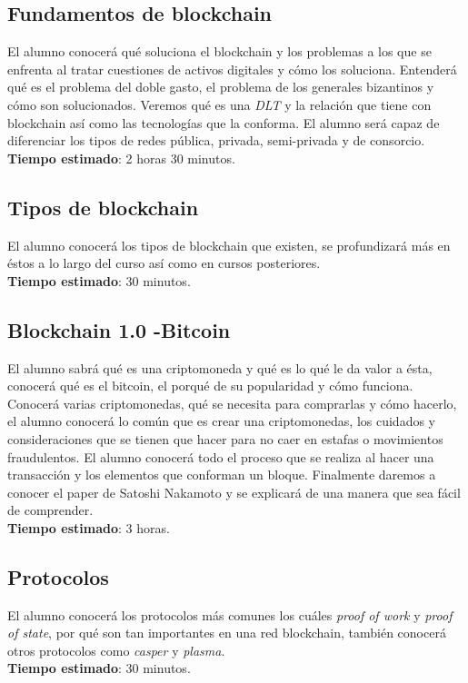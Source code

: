\documentclass[a4paper,12pt]{/home/armando/Documentos/Cursos/LaTeX/Plantillas/lib/pub}
\begin{document}
\subsection{Fundamentos de blockchain}
El alumno conocerá qué soluciona el blockchain y los problemas a los que se enfrenta al tratar cuestiones de activos digitales y cómo los soluciona. Entenderá qué es el problema del doble gasto, el problema de los generales bizantinos y cómo son solucionados. Veremos qué es una \textit{DLT} y la relación que tiene con blockchain así como las tecnologías que la conforma. El alumno será capaz de diferenciar los tipos de redes pública, privada, semi-privada y de consorcio.\\
\textbf{Tiempo estimado}: 2 horas 30 minutos.

\subsection{Tipos de blockchain}
El alumno conocerá los tipos de blockchain que existen, se profundizará más en éstos a lo largo del curso así como en cursos posteriores.\\
\textbf{Tiempo estimado}: 30 minutos.

\subsection{Blockchain 1.0 -Bitcoin}
El alumno sabrá qué es una criptomoneda y qué es lo qué le da valor a ésta, conocerá qué es el bitcoin, el porqué de su popularidad y cómo funciona. Conocerá varias criptomonedas, qué se necesita para comprarlas y cómo hacerlo, el alumno conocerá lo común que es crear una criptomonedas, los cuidados y consideraciones que se tienen que hacer para no caer en estafas o movimientos fraudulentos. El alumno conocerá todo el proceso que se realiza al hacer una transacción y los elementos que conforman un bloque. Finalmente daremos a conocer el paper de Satoshi Nakamoto y se explicará de una manera que sea fácil de comprender.\\
\textbf{Tiempo estimado}: 3 horas.
\newpage
\subsection{Protocolos}
El alumno conocerá los protocolos más comunes los cuáles \textit{proof of work} y \textit{proof of state}, por qué son tan importantes en una red blockchain, también conocerá otros protocolos como \textit{casper} y \textit{plasma}.\\
\textbf{Tiempo estimado}: 30 minutos.
\end{document}
